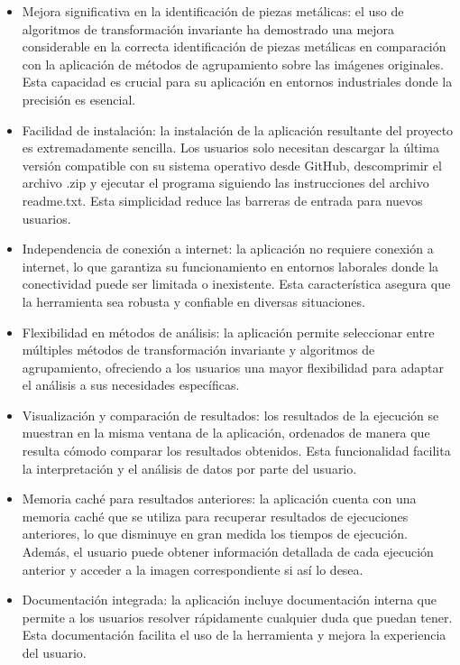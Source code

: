 \begin{itemize}
    \item Mejora significativa en la identificación de piezas metálicas: el uso de algoritmos de transformación invariante ha demostrado una mejora considerable en la correcta identificación de piezas metálicas en comparación con la aplicación de métodos de agrupamiento sobre las imágenes originales. Esta capacidad es crucial para su aplicación en entornos industriales donde la precisión es esencial.
    \item Facilidad de instalación: la instalación de la aplicación resultante del proyecto es extremadamente sencilla. Los usuarios solo necesitan descargar la última versión compatible con su sistema operativo desde GitHub, descomprimir el archivo .zip y ejecutar el programa siguiendo las instrucciones del archivo readme.txt. Esta simplicidad reduce las barreras de entrada para nuevos usuarios.
    \item Independencia de conexión a internet: la aplicación no requiere conexión a internet, lo que garantiza su funcionamiento en entornos laborales donde la conectividad puede ser limitada o inexistente. Esta característica asegura que la herramienta sea robusta y confiable en diversas situaciones.
    \item Flexibilidad en métodos de análisis: la aplicación permite seleccionar entre múltiples métodos de transformación invariante y algoritmos de agrupamiento, ofreciendo a los usuarios una mayor flexibilidad para adaptar el análisis a sus necesidades específicas.
    \item Visualización y comparación de resultados: los resultados de la ejecución se muestran en la misma ventana de la aplicación, ordenados de manera que resulta cómodo comparar los resultados obtenidos. Esta funcionalidad facilita la interpretación y el análisis de datos por parte del usuario.
    \item Memoria caché para resultados anteriores: la aplicación cuenta con una memoria caché que se utiliza para recuperar resultados de ejecuciones anteriores, lo que disminuye en gran medida los tiempos de ejecución. Además, el usuario puede obtener información detallada de cada ejecución anterior y acceder a la imagen correspondiente si así lo desea.
    \item Documentación integrada: la aplicación incluye documentación interna que permite a los usuarios resolver rápidamente cualquier duda que puedan tener. Esta documentación facilita el uso de la herramienta y mejora la experiencia del usuario.
\end{itemize}

